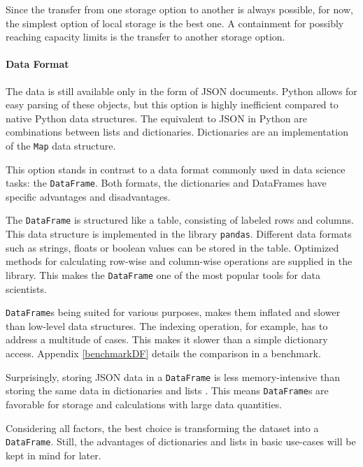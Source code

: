     	Since the transfer from one storage option to another is always possible, for now, the simplest option of local storage is the best one. A containment for possibly reaching capacity limits is the transfer to another storage option.
        
        \paragraph{Data Format}
        The data is still available only in the form of \ac{JSON} documents. Python allows for easy parsing of these objects, but this option is highly inefficient compared to native Python data structures.
        The equivalent to \ac{JSON} in Python are combinations between lists and dictionaries. Dictionaries are an implementation of the \lstinline|Map| data structure.
        
        This option stands in contrast to a data format commonly used in data science tasks: the \lstinline|DataFrame|. Both formats, the dictionaries and DataFrames have specific advantages and disadvantages.
        
        The \lstinline|DataFrame| is structured like a table, consisting of labeled rows and columns. This data structure is implemented in the library \lstinline|pandas|. 
        Different data formats such as strings, floats or boolean values can be stored in the table.        Optimized methods for calculating row-wise and column-wise operations are supplied in the library. This makes the \lstinline|DataFrame| one of the most popular tools for data scientists.
        
       \lstinline|DataFrame|s being suited for various purposes, makes them inflated and slower than low-level data structures. The indexing operation, for example, has to address a multitude of cases. This makes it slower than a simple dictionary access. Appendix \ref{benchmarkDF} details the comparison in a benchmark.
       
       Surprisingly, storing \ac{JSON} data in a \lstinline|DataFrame| is less memory-intensive than storing the same data in dictionaries and lists \cite{DFvsJSON}. This means  \lstinline|DataFrame|s are favorable for storage and calculations with large data quantities.
       
       Considering all factors, the best choice is transforming the dataset into a  \lstinline|DataFrame|. Still, the advantages of dictionaries and lists in basic use-cases will be kept in mind for later.
     
